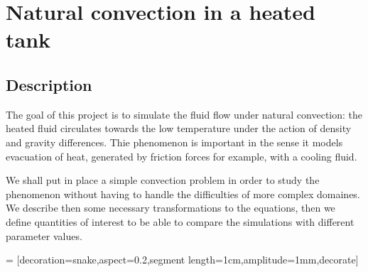 \newcommand{\Gr}{\ensuremath{\mathrm{Gr}\xspace}}
\renewcommand{\Pr}{\ensuremath{\mathrm{Pr}\xspace}}

\section{Natural convection in a heated tank}

\subsection{Description}
\label{sec:description}

The goal of this project is to simulate the fluid flow under natural
convection: the heated fluid circulates towards the low temperature
under the action of density and gravity differences. Thie phenomenon
is important in the sense it models evacuation of heat, generated by
friction forces for example, with  a cooling fluid.

We shall put in place a simple convection problem in order to study
the phenomenon without having to handle the difficulties of more
complex domaines. We describe then some necessary transformations to
the equations, then we define quantities of interest to be able to
compare the simulations with different parameter values.


\newcommand{\Water}{\text{\textsc{Water}}\xspace}
\newcommand{\Fluid}{\text{\textsc{Fluid}}\xspace}
 = [decoration={snake,aspect=0.2,segment length=1cm,amplitude=1mm},decorate]

